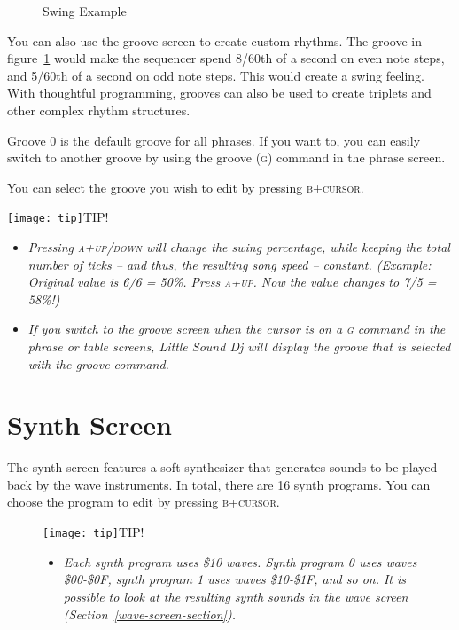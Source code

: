 \begin{figure}[htbp]
	\begin{center}
	\end{center}
	\caption{Swing Example}
	\label{fig:groove-swing}
\end{figure}

You can also use the groove screen to create custom rhythms. The groove in figure~\ref{fig:groove-swing} would make the sequencer spend 8/60th of a second on even note steps, and 5/60th of a second on odd note steps. This would create a swing feeling. With thoughtful programming, grooves can also be used to create triplets and other complex rhythm structures.

Groove 0 is the default groove for all phrases. If you want to, you can easily switch to another groove by using the groove (\textsc{g}) command in the phrase screen.

You can select the groove you wish to edit by pressing \textsc{b+cursor}.

\texttt{[image: tip]}TIP!
\begin{itemize}
	\item \textit{ Pressing \textsc{a+up/down} will change the swing percentage, while keeping the total number of ticks -- and thus, the resulting song speed -- constant. (Example: Original value is 6/6 = 50\%. Press \textsc{a+up}. Now the value changes to 7/5 = 58\%!) }
	\item \textit{ If you switch to the groove screen when the cursor is on a \textsc{g} command in the phrase or table screens, Little Sound Dj will display the groove that is selected with the groove command.}
\end{itemize}

\section{Synth Screen}

The synth screen features a soft synthesizer that generates sounds to be played back by the wave instruments. In total, there are 16 synth programs. You can choose the program to edit by pressing \textsc{b+cursor}.

\begin{figure}[h]
\texttt{[image: tip]}TIP!
\begin{itemize}
	\item \textit{Each synth program uses \$10 waves. Synth program 0 uses waves \$00-\$0F, synth program 1 uses waves \$10-\$1F, and so on. It is possible to look at the resulting synth sounds in the wave screen (Section~\ref{wave-screen-section}).}
\end{itemize}
\end{figure}

